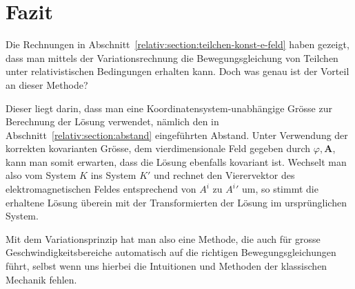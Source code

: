 
\section{Fazit 
\label{relativ:section:fazit}}

Die Rechnungen in Abschnitt~\ref{relativ:section:teilchen-konst-e-feld}
haben gezeigt, dass man mittels der Variationsrechnung
die Bewegungsgleichung von Teilchen unter relativistischen
Bedingungen erhalten kann.
Doch was genau ist der Vorteil an dieser Methode?

Dieser liegt darin, dass man eine
Koordinatensystem-unabhängige Grösse zur Berechnung
der Lösung verwendet, nämlich den in Abschnitt~\ref{relativ:section:abstand}
eingeführten Abstand.
Unter Verwendung der korrekten kovarianten Grösse,
dem vierdimensionale Feld gegeben durch \(\varphi, \bm{A}\),
kann man somit erwarten, dass die Lösung ebenfalls kovariant ist.
Wechselt man also vom System \(K\) ins System \(K'\) und
rechnet den Vierervektor des elektromagnetischen Feldes entsprechend
von \(A^i\) zu \({A^i}'\) um, so stimmt die erhaltene Lösung
überein mit der Transformierten der Lösung im ursprünglichen System.

Mit dem Variationsprinzip hat man also eine Methode,
die auch für grosse Geschwindigkeitsbereiche automatisch
auf die richtigen Bewegungsgleichungen führt, selbst wenn uns
hierbei die Intuitionen und Methoden der klassischen Mechanik fehlen.
